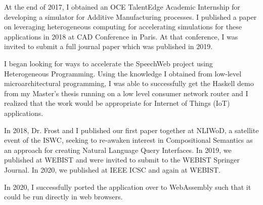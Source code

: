 \documentclass[../main.tex]{subfiles}
\begin{document}
\begin{refsection}
    At the end of 2017, I obtained an OCE TalentEdge Academic Internship for developing a simulator for Additive Manufacturing processes.  I published a paper on leveraging heterogeneous computing for accelerating simulations for these applications in 2018 at CAD Conference in Paris.  At that conference, I was invited to submit a full journal paper which was published in 2019. %

    I began looking for ways to accelerate the SpeechWeb project using Heterogeneous Programming.
    Using the knowledge I obtained from low-level microarchitectural programming, I was able to successfully get the Haskell demo from my Master's thesis running on a low level consumer network router and I realized that the work would be appropriate for Internet of Things (IoT) applications.

    In 2018, Dr. Frost and I published our first paper together at NLIWoD, a satellite event of the ISWC, seeking to re-awaken interest in Compositional Semantics as an approach for creating Natural Language Query Interfaces.  In 2019, we published at WEBIST and were invited to submit to the WEBIST Springer Journal.  In 2020, we published at IEEE ICSC and again at WEBIST.

    In 2020, I successfully ported the application over to WebAssembly such that it could be run directly in web browsers.



\end{refsection}
\end{document}
